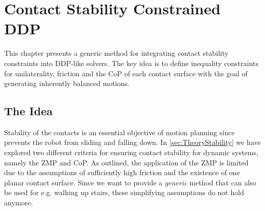 
\chapter{Contact Stability Constrained DDP}\label{c3}
This chapter presents a generic method for integrating contact stability constraints into DDP-like solvers. The key idea is to define inequality constraints for unilaterality, friction and the \gls{CoP} of each contact surface with the goal of generating inherently balanced motions.

\section{The Idea}\label{sec:StabilityIdea}
Stability of the contacts is an essential objective of motion planning since prevents the robot from sliding and falling down. In \cref{sec:TheoryStability} we have explored two different criteria for ensuring contact stability for dynamic systems, namely the \gls{ZMP} and \gls{CoP}. As outlined, the application of the \gls{ZMP} is limited due to the assumptions of sufficiently high friction and the existence of one planar contact surface. Since we want to provide a \textit{generic} method that can also be used for e.g. walking up stairs, these simplifying assumptions do not hold anymore. 

